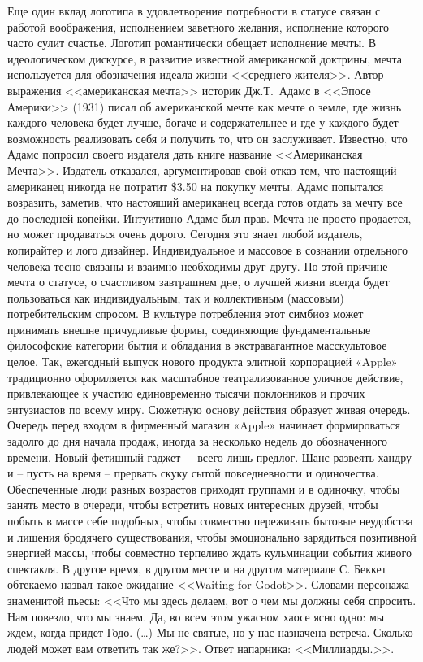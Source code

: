 Еще один вклад логотипа в удовлетворение потребности в статусе связан с работой
воображения, исполнением заветного желания, исполнение которого часто сулит
счастье. Логотип романтически обещает исполнение мечты. В идеологическом
дискурсе, в развитие известной американской доктрины, мечта используется для
обозначения идеала жизни <<среднего жителя>>. Автор выражения <<американская
мечта>> историк Дж.Т.~Адамс в <<Эпосе Америки>> (1931) писал об американской
мечте как мечте о земле, где жизнь каждого человека будет лучше, богаче и
содержательнее и где у каждого будет возможность реализовать себя и получить
то, что он
заслуживает\autocite{adams1938epic}. Известно, что Адамс попросил своего
издателя дать книге название <<Американская Мечта>>. Издатель отказался,
аргументировав свой отказ тем, что настоящий американец никогда не потратит \$3.50
на покупку мечты. Адамс попытался возразить, заметив, что настоящий американец
всегда готов отдать за мечту все до последней копейки. Интуитивно Адамс был прав.
Мечта не просто продается, но может продаваться очень дорого. Сегодня это знает любой издатель, копирайтер и лого дизайнер. Индивидуальное и массовое в сознании отдельного человека тесно связаны и взаимно необходимы друг другу. По этой причине мечта о статусе, о счастливом завтрашнем дне, о лучшей жизни всегда будет пользоваться как индивидуальным, так и коллективным (массовым) потребительским спросом.  В культуре потребления этот симбиоз может принимать внешне причудливые формы, соединяющие фундаментальные философские категории бытия и обладания в экстравагантное масскультовое  целое. Так, ежегодный выпуск нового продукта элитной корпорацией  «Apple» традиционно оформляется как масштабное театрализованное уличное действие, привлекающее к участию единовременно  тысячи поклонников и прочих энтузиастов по всему миру. Сюжетную основу  действия образует живая очередь. Очередь перед  входом в фирменный магазин «Apple» начинает формироваться задолго до дня начала продаж, иногда за несколько недель до обозначенного времени. Новый фетишный гаджет -– всего лишь предлог. Шанс развеять хандру и -- пусть на время -- прервать скуку сытой повседневности и одиночества.   Обеспеченные люди разных возрастов приходят группами и в одиночку, чтобы занять место в очереди, чтобы встретить новых интересных друзей, чтобы побыть в массе себе подобных, чтобы совместно переживать бытовые неудобства и лишения бродячего существования, чтобы эмоционально зарядиться позитивной энергией массы, чтобы совместно терпеливо ждать кульминации события живого спектакля.  В другое время, в другом месте и на другом материале С. Беккет обтекаемо назвал такое ожидание <<Waiting for Godot>>.  Словами персонажа знаменитой пьесы: <<Что мы здесь делаем, вот о чем мы должны себя спросить. Нам повезло, что мы знаем. Да, во всем этом ужасном хаосе ясно одно: мы ждем, когда придет Годо. (\ldots) Мы не святые, но у нас назначена встреча. Сколько людей может вам ответить так же?>>.  Ответ напарника: <<Миллиарды.>>\autocite{bekket2009}.

